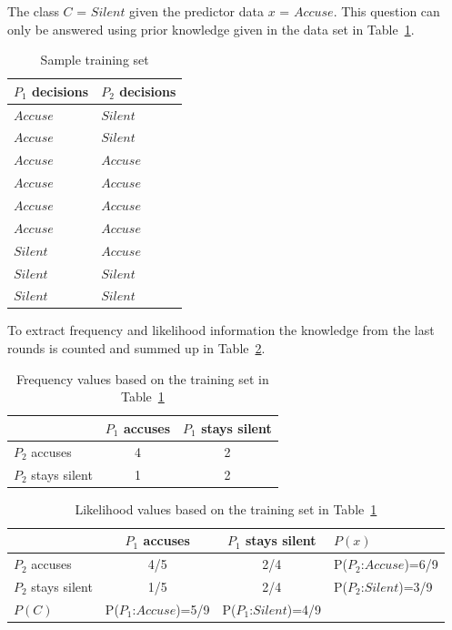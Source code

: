 \documentclass{acm_proc_article-sp}
\begin{document}
The class $C$ = $Silent$ given the predictor data $x$ = $Accuse$. 
This question can only be answered using prior knowledge given in the data set in Table~\ref{tab:training-set}.

\begin{table}
\centering
\begin{tabular}{l | l }
 $P_1$ decisions & $P_2$ decisions \\
  \hline
$Accuse$&$Silent$\\
  \hline
$Accuse$&$Silent$\\
  \hline
$Accuse$&$Accuse$\\
  \hline
$Accuse$&$Accuse$\\
  \hline
$Accuse$&$Accuse$\\
  \hline
$Accuse$&$Accuse$\\
\hline
$Silent$&$Accuse$\\
\hline
$Silent$&$Silent$\\
\hline
$Silent$&$Silent$\\
\end{tabular}
\caption{Sample training set}
\label{tab:training-set}
\end{table}

To extract frequency and likelihood information the knowledge from the
last rounds is counted and summed up in Table~\ref{tab:frequency-val}.

\begin{table}
\centering
\begin{tabular}{l | c | c}
                     & $P_1$ accuses    & $P_1$ stays silent \\
  \hline
  $P_2$ accuses      & 4 				& 2 				 \\
  \hline
  $P_2$ stays silent & 1 				& 2   				 \\
\end{tabular}
\caption{Frequency values based on the training set in Table~\ref{tab:training-set}}
\label{tab:frequency-val}
\end{table}

\begin{table}
\centering
\begin{tabular}{l | c | c | l}
                     & $P_1$ accuses       & $P_1$ stays silent  & $P(x)$ \\
  \hline
  $P_2$ accuses      & 4/5   	 & 2/4	   &  P($P_2$:$Accuse$)=6/9 	  \\
  \hline
  $P_2$ stays silent & 1/5		 & 2/4 	   &  P($P_2$:$Silent$)=3/9 	  \\
  \hline
  $P(C)$ 			 & P($P_1$:$Accuse$)=5/9 & P($P_1$:$Silent$)=4/9 &    \\
  \end{tabular}
\caption{Likelihood values based on the training set in Table~\ref{tab:training-set}}
\label{tab:likelihood-val}
\end{table}
\end{document}
